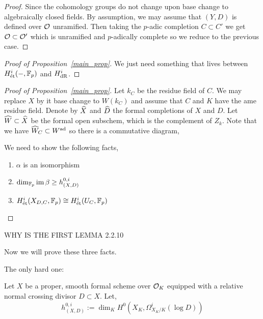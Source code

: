 \documentclass[12pt]{article}
\begin{document}
\begin{proof}
Since the \etale cohomology groups do not change upon base change to algebraically closed fields. By assumption, we may assume that $(Y, D)$ is defined over $\mathcal{O}$ unramified. Then taking the $p$-adic completion $C \subset C'$ we get $\mathcal{O} \subset \mathcal{O}'$ which is unramified and $p$-adically complete so we reduce to the previous case.  
\end{proof}

\begin{proof}[Proof of Proposition~\ref{main_prop}]
We just need something that lives between $H_{\text{\'{e}t}}^i(-,\mathbb{F}_p)$ and $H_{\mathrm{dR}}^i$.
\end{proof}


\begin{proof}[Proof of Proposition~\ref{main_prop}]
Let $k_C$ be the residue field of $C$. We may replace $X$ by it base change to $W(k_C)$ and assume that $C$ and $K$ have the ame residue field. Denote by $\widehat{X}$ and $\widehat{D}$ the formal completions of $X$ and $D$. Let $\widehat{W} \subset \widehat{X}$ be the formal open subschem, which is the complement of $Z_k$. Note that we have $\widehat{W}_C \subset W^{\mathrm{ad}}$ so there is a commutative diagram,
\begin{center}
\end{center}
We need to show the following facts,
\begin{enumerate}
\item $\alpha$ is an isomorphism
\item $\dim_{\mathbb{F}_p} \operatorname{\mathrm{im}}{\beta} \ge h^{0,i}_{(X,D)}$
\item $H^i_{\text{\'{e}t}}(X_{D,C}, \mathbb{F}_p) \cong H^i_{\text{\'{e}t}}(U_C, \mathbb{F}_p)$
\end{enumerate}
\end{proof}

{\color{red} WHY IS THE FIRST LEMMA 2.2.10}

Now we will prove these three facts. 

The only hard one:

Let $X$ be a proper, smooth formal scheme over $\mathcal{O}_K$ equipped with a relative normal crossing divisor $D \subset X$. Let,
\[ h^{0,i}_{(X,D)} := \dim_K H^0(X_K, \Omega^i_{X_K/K}(\log{D})) \]
\end{document}
